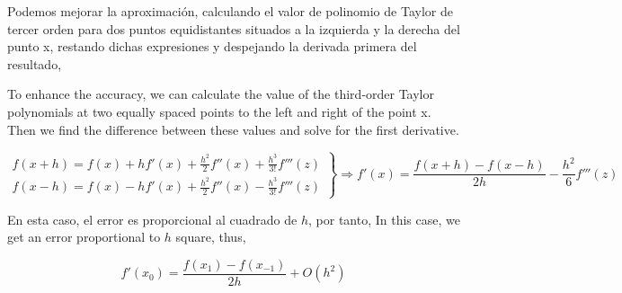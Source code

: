 \begin{figure}[h]
\centering
{} \qquad 
{}
\label{fig:diffin}
\end{figure}
\begin{paracol}{2}
Podemos mejorar la aproximación, calculando el valor de polinomio de Taylor de tercer orden para dos puntos equidistantes situados a la izquierda y la derecha del punto x, restando dichas expresiones y despejando la derivada primera del resultado,

\switchcolumn

To enhance the accuracy, we can calculate the value of the third-order Taylor polynomials at two equally spaced points to the left and right of the point x. Then we find the difference between these values and solve for the first derivative.
\end{paracol}
\begin{equation*}
\left. \begin{aligned}
f(x+h)=f(x)+hf'(x)+\frac{h^2}{2}f''(x)+\frac{h^3}{3!}f'''(z)\\
f(x-h)=f(x)-hf'(x)+\frac{h^2}{2}f''(x)-\frac{h^3}{3!}f'''(z)
\end{aligned} \right\rbrace \Rightarrow f'(x)=\frac{f(x+h)-f(x-h)}{2h}-\frac{h^2}{6}f'''(z) 
\end{equation*}
\begin{paracol}{2}
En esta caso, el error es proporcional al cuadrado de $h$, por tanto,
\switchcolumn
In this case, we get an error proportional to $h$ square, thus,
\end{paracol}
\begin{equation*}
f'(x_0)=\frac{f(x_1)-f(x_{-1})}
{2h}+O(h^2)
\end{equation*}
